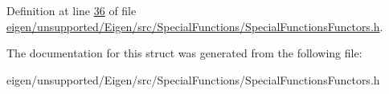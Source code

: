 Definition at line \hyperlink{eigen_2unsupported_2_eigen_2src_2_special_functions_2_special_functions_functors_8h_source_l00036}{36} of file \hyperlink{eigen_2unsupported_2_eigen_2src_2_special_functions_2_special_functions_functors_8h_source}{eigen/unsupported/\+Eigen/src/\+Special\+Functions/\+Special\+Functions\+Functors.\+h}.



The documentation for this struct was generated from the following file\+:\begin{DoxyCompactItemize}
\item 
eigen/unsupported/\+Eigen/src/\+Special\+Functions/\+Special\+Functions\+Functors.\+h\end{DoxyCompactItemize}
